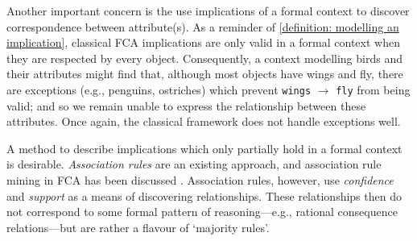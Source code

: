 Another important concern is the use implications of a formal context to discover correspondence between attribute(s). As a reminder of \cref{definition: modelling an implication}, classical FCA implications are only valid in a formal context when they are respected by every object. Consequently, a context modelling birds and their attributes might find that, although most objects have wings and fly, there are exceptions (e.g., penguins, ostriches) which prevent \texttt{wings} $\rightarrow$ \texttt{fly} from being valid; and so we remain unable to express the relationship between these attributes. Once again, the classical framework does not handle exceptions well.

A method to describe implications which only partially hold in a formal context is desirable. \textit{Association rules} are an existing approach, and association rule mining in FCA has been discussed \cite{ganter2016conceptual,lakhal2005efficient}. Association rules, however, use \textit{confidence} and \textit{support} as a means of discovering relationships. These relationships then do not correspond to some formal pattern of reasoning—e.g., rational consequence relations—but are rather a flavour of `majority rules'.

